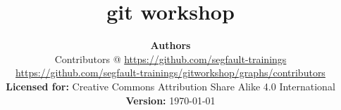 \documentclass[t,10pt]{beamer}
\begin{document}
\title{git workshop}
\author{
  \textbf{Authors} \\
  Contributors @ \url{https://github.com/segfault-trainings} \\
  \url{https://github.com/segfault-trainings/gitworkshop/graphs/contributors} \\
  \vspace{3em}
  \textbf{Licensed for:} Creative Commons Attribution Share Alike 4.0 International
  \textbf{Version:} \today
}

\frame{\titlepage}


\end{document}
